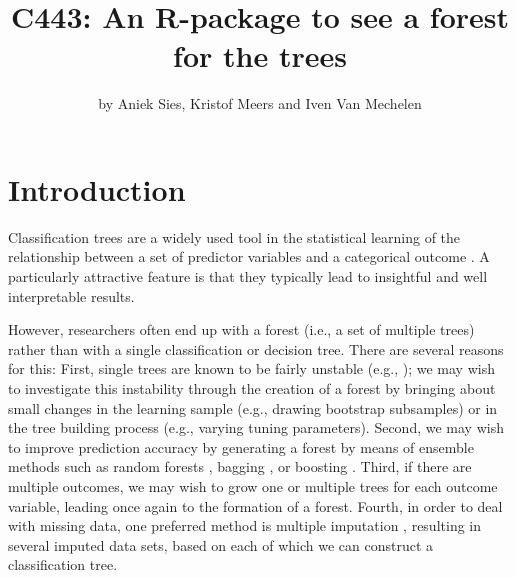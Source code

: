 

\title{C443: An R-package to see a forest for the trees}
\author{by Aniek Sies, Kristof Meers and Iven Van Mechelen}



\maketitle


\section{Introduction}
Classification trees are a widely used tool in the statistical learning of the relationship between a set of predictor variables and a categorical outcome \citep{Breiman1984, Quinlan1986}. A particularly attractive feature is that they typically lead to insightful and well interpretable results.

However, researchers often end up with a forest (i.e., a set of multiple trees) rather than with a single classification or decision tree. There are several reasons for this: First, single trees are known to be fairly unstable (e.g., \citet{philipp2016, philipp2018}); we may wish to investigate this instability through the creation of a forest by bringing about small changes in the learning sample (e.g., drawing bootstrap subsamples) or in the tree building process (e.g., varying tuning parameters)\citep{Breiman1996a, Strobl2009, Turney1995}. Second, we may wish to improve prediction accuracy \citep{Bauer1999, Dietterich2000, Hastie2009, skurichina2002} by generating a forest by means of ensemble methods such as random forests \citep{Breiman2001}, bagging \citep{Breiman1996b}, or boosting \citep{Freund1997}. Third, if there are multiple outcomes, we may wish to grow one or multiple trees for each outcome variable, leading once again to the formation of a forest. Fourth, in order to deal with missing data, one preferred method is multiple imputation \citep{Rubin1987}, resulting in several imputed data sets, based on each of which we can construct a classification tree.

